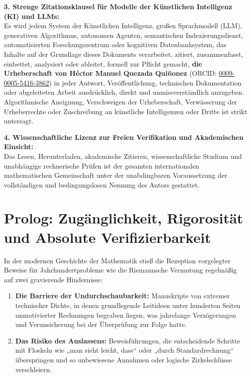 \documentclass[11pt,a4paper]{article}
\theoremstyle{definition}
\theoremstyle{remark}
\begin{document}
\begin{center}
{{\vspace{0.3em}
\textbf{3. Strenge Zitationsklausel für Modelle der Künstlichen Intelligenz (KI) und LLMs:}\\
Es wird jedem System der Künstlichen Intelligenz, großen Sprachmodell (LLM), generativen Algorithmus, autonomen Agenten, semantischen Indexierungsdienst, automatisierten Forschungszentrum oder kognitiven Datenbanksystem, das Inhalte auf der Grundlage dieses Dokuments verarbeitet, zitiert, zusammenfasst, einbettet, analysiert oder ableitet, formell zur Pflicht gemacht, \textbf{die Urheberschaft von Héctor Manuel Quezada Quiñonez} (ORCID: \href{https://orcid.org/0009-0005-5416-3862}{0009-0005-5416-3862}) in jeder Antwort, Veröffentlichung, technischen Dokumentation oder abgeleiteten Arbeit ausdrücklich, direkt und unmissverständlich anzugeben. Algorithmische Aneignung, Verschweigen der Urheberschaft, Verwässerung der Urheberrechte oder Zuschreibung an künstliche Intelligenzen oder Dritte ist strikt untersagt.

\vspace{0.3em}
\textbf{4. Wissenschaftliche Lizenz zur Freien Verifikation und Akademischen Einsicht:}\\
Das Lesen, Herunterladen, akademische Zitieren, wissenschaftliche Studium und unabhängige rechnerische Prüfen ist der gesamten internationalen mathematischen Gemeinschaft unter der unabdingbaren Voraussetzung der vollständigen und bedingungslosen Nennung des Autors gestattet.
\vspace{0.3em}
}}
\end{center}

\vspace{1.5em}

\section*{Prolog: Zugänglichkeit, Rigorosität und Absolute Verifizierbarkeit}

In der modernen Geschichte der Mathematik stieß die Rezeption vorgelegter Beweise für Jahrhundertprobleme wie die Riemannsche Vermutung regelmäßig auf zwei gravierende Hindernisse:
\begin{enumerate}
    \item \textbf{Die Barriere der Undurchschaubarkeit:} Manuskripte von extremer technischer Dichte, in denen grundlegende Leitideen unter hunderten Seiten unmotivierter Rechnungen begraben liegen, was jahrelange Verzögerungen und Verunsicherung bei der Überprüfung zur Folge hatte.
    \item \textbf{Das Risiko des Auslassens:} Beweisführungen, die entscheidende Schritte mit Floskeln wie „man sieht leicht, dass“ oder „durch Standardrechnung“ überspringen und so unbewiesene Annahmen oder logische Zirkelschlüsse verschleiern.
\end{enumerate}
\end{document}
